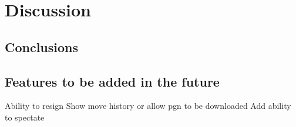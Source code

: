 \chapter{Discussion}
\label{chapter4}

\section{Conclusions}

\section{Features to be added in the future}
Ability to resign\linebreak
Show move history or allow pgn to be downloaded\linebreak
Add ability to spectate
